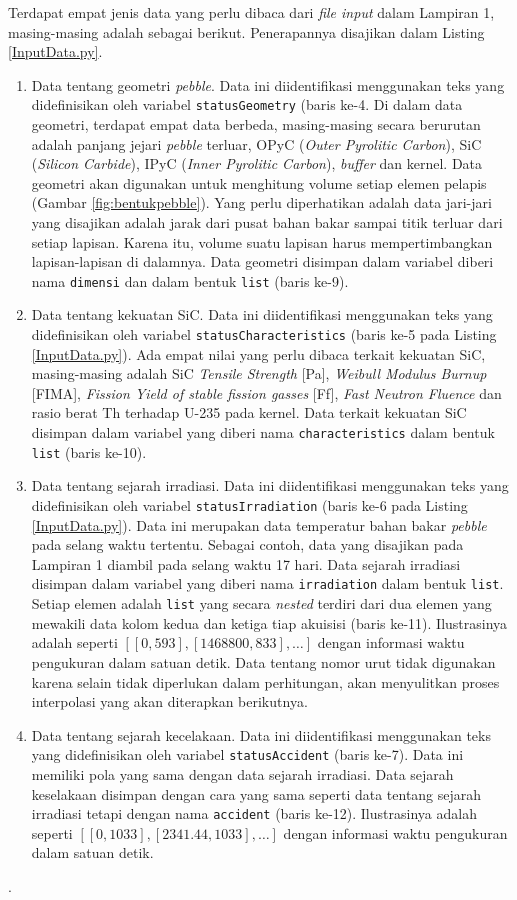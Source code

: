 \documentclass[a4paper,11pt]{report}
\begin{document}
Terdapat empat jenis data yang perlu dibaca dari \textit{file input} dalam Lampiran 1, masing-masing adalah sebagai berikut. Penerapannya disajikan dalam Listing \ref{InputData.py}.
\begin{enumerate}
  \item Data tentang geometri \textit{pebble}. Data ini diidentifikasi menggunakan teks yang didefinisikan oleh variabel \texttt{statusGeometry} (baris ke-4. Di dalam data geometri, terdapat empat data berbeda, masing-masing secara berurutan adalah panjang jejari \textit{pebble} terluar, OPyC (\textit{Outer Pyrolitic Carbon}), SiC (\textit{Silicon Carbide}), IPyC (\textit{Inner Pyrolitic Carbon}), \textit{buffer} dan kernel. Data geometri akan digunakan untuk menghitung volume setiap elemen pelapis (Gambar \ref{fig:bentukpebble}). Yang perlu diperhatikan adalah data jari-jari yang disajikan adalah jarak dari pusat bahan bakar sampai titik terluar dari setiap lapisan. Karena itu, volume suatu lapisan harus mempertimbangkan lapisan-lapisan di dalamnya. Data geometri disimpan dalam variabel diberi nama \texttt{dimensi} dan dalam bentuk \texttt{list} (baris ke-9).
  \item Data tentang kekuatan SiC. Data ini diidentifikasi menggunakan teks yang didefinisikan oleh variabel \texttt{statusCharacteristics} (baris ke-5 pada Listing \ref{InputData.py}). Ada empat nilai yang perlu dibaca terkait kekuatan SiC, masing-masing adalah SiC \textit{Tensile Strength} [Pa],	\textit{Weibull Modulus	Burnup} [FIMA],	\textit{Fission Yield of stable fission gasses} [Ff],	\textit{Fast Neutron Fluence}	dan rasio berat Th terhadap U-235 pada kernel. Data terkait kekuatan SiC disimpan dalam variabel yang diberi nama \texttt{characteristics} dalam bentuk \texttt{list} (baris ke-10).
    \item Data tentang sejarah irradiasi. Data ini diidentifikasi menggunakan teks yang didefinisikan oleh variabel \texttt{statusIrradiation} (baris ke-6 pada Listing \ref{InputData.py}). Data ini merupakan data temperatur bahan bakar \textit{pebble} pada selang waktu tertentu. Sebagai contoh, data yang disajikan pada Lampiran 1 diambil pada selang waktu 17 hari. Data sejarah irradiasi disimpan dalam variabel yang diberi nama \texttt{irradiation} dalam bentuk \texttt{list}. Setiap elemen adalah \texttt{list} yang secara \textit{nested} terdiri dari dua elemen yang mewakili data kolom kedua dan ketiga tiap akuisisi (baris ke-11). Ilustrasinya adalah seperti $[[0,	593], [1468800,	833], \ldots]$ dengan informasi waktu pengukuran dalam satuan detik. Data tentang nomor urut tidak digunakan karena selain tidak diperlukan dalam perhitungan, akan menyulitkan proses interpolasi yang akan diterapkan berikutnya.
    \item Data tentang sejarah kecelakaan. Data ini diidentifikasi menggunakan teks yang didefinisikan oleh variabel \texttt{statusAccident} (baris ke-7). Data ini memiliki pola yang sama dengan data sejarah irradiasi. Data sejarah keselakaan disimpan dengan cara yang sama seperti data tentang sejarah irradiasi tetapi dengan nama \texttt{accident} (baris ke-12). Ilustrasinya adalah seperti $[[0,	1033], [2341.44,	1033],\ldots]$ dengan informasi waktu pengukuran dalam satuan detik.
\end{enumerate}.
\end{document}
